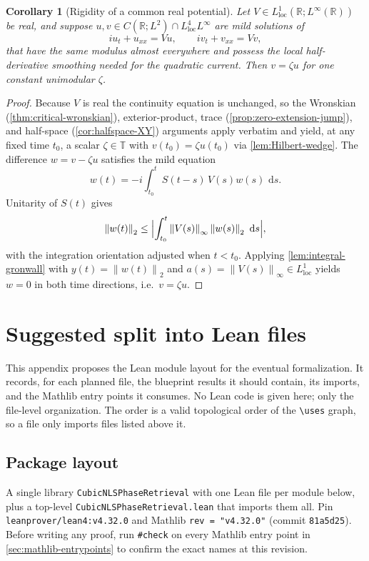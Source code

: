 \documentclass[11pt,oneside]{book}
\providecommand{\uses}[1]{}
\newtheorem{corollary}[theorem]{Corollary}
\theoremstyle{definition}
\theoremstyle{remark}
\newcommand{\R}{\mathbb R}
\newcommand{\T}{\mathbb T}
\newcommand{\1}{\mathbf 1}
\newcommand{\loc}{\mathrm{loc}}
\newcommand{\dd}{\,\mathrm d}
\newcommand{\norm}[1]{\left\lVert #1\right\rVert}
\begin{document}
\begin{corollary}[Rigidity of a common real potential]\label{cor:linear-common-potential}
Let $V\in L^1_{\loc}(\R;L^\infty(\R))$ be real, and suppose
$u,v\in C(\R;L^2)\cap L^4_{\loc}L^\infty$ are mild solutions of
\[
 iu_t+u_{xx}=Vu,\qquad iv_t+v_{xx}=Vv ,
\]
that have the same modulus almost everywhere and possess the local
half-derivative smoothing needed for the quadratic current.  Then $v=\zeta u$
for one constant unimodular $\zeta$.
\end{corollary}

\begin{proof}
\uses{thm:critical-wronskian, prop:zero-extension-jump, cor:halfspace-XY, lem:Hilbert-wedge, lem:integral-gronwall}
Because $V$ is real the continuity equation is unchanged, so the Wronskian
(\cref{thm:critical-wronskian}), exterior-product, trace
(\cref{prop:zero-extension-jump}), and half-space
(\cref{cor:halfspace-XY}) arguments apply verbatim and yield, at any fixed time
$t_0$, a scalar $\zeta\in\T$ with $v(t_0)=\zeta u(t_0)$ via
\cref{lem:Hilbert-wedge}.  The difference $w=v-\zeta u$ satisfies the mild
equation
\[
 w(t)=-i\int_{t_0}^t S(t-s)\,V(s)w(s)\,\dd s .
\]
Unitarity of $S(t)$ gives
\[
 \norm{w(t)}_2\le\Bigl|\int_{t_0}^t\norm{V(s)}_\infty\norm{w(s)}_2\,\dd s\Bigr| ,
\]
with the integration orientation adjusted when $t<t_0$.  Applying
\cref{lem:integral-gronwall} with $y(t)=\norm{w(t)}_2$ and
$a(s)=\norm{V(s)}_\infty\in L^1_{\loc}$ yields $w=0$ in both time directions,
i.e.\ $v=\zeta u$.
\end{proof}


\appendix

\chapter{Suggested split into Lean files}\label{app:lean-split}

This appendix proposes the Lean module layout for the eventual formalization. It records, for each planned
file, the blueprint results it should contain, its imports, and the Mathlib entry points it consumes. No Lean
code is given here; only the file-level organization. The order is a valid topological order of the
\verb|\uses| graph, so a file only imports files listed above it.

\section{Package layout}
A single library \texttt{CubicNLSPhaseRetrieval} with one Lean file per module below, plus a top-level
\texttt{CubicNLSPhaseRetrieval.lean} that imports them all. Pin \texttt{leanprover/lean4:v4.32.0} and Mathlib
\texttt{rev = "v4.32.0"} (commit \texttt{81a5d25}). Before writing any proof, run \verb|#check| on every Mathlib
entry point in \cref{sec:mathlib-entrypoints} to confirm the exact names at this revision.
\end{document}
